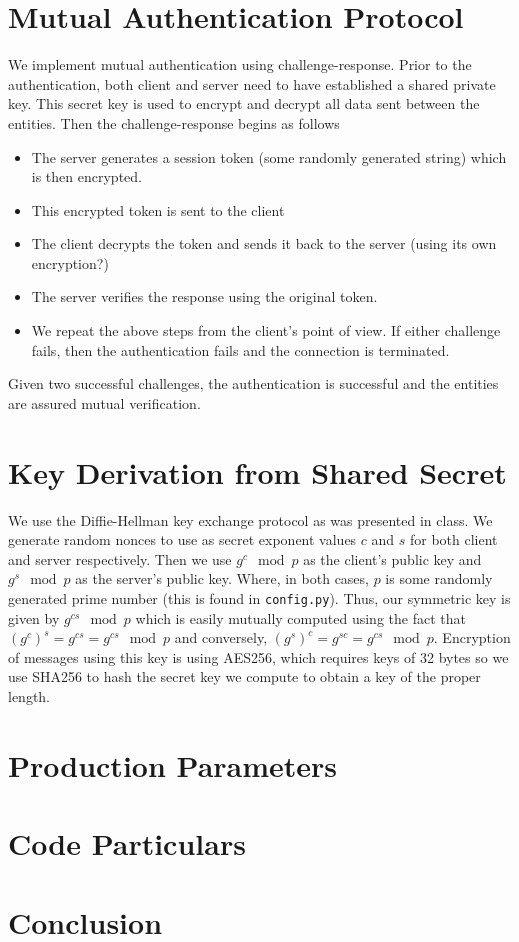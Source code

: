\documentclass[conference]{IEEEtran}
\begin{document}
\section{Mutual Authentication Protocol}
We implement mutual authentication using challenge-response. Prior to the authentication, both client and server need to have established a shared private key. This secret key is used to encrypt and decrypt all data sent between the entities. Then the challenge-response begins as follows
\begin{itemize}
	\item The server generates a session token (some randomly generated string) which is then encrypted. 
	\item This encrypted token is sent to the client
	\item The client decrypts the token and sends it back to the server (using its own encryption?)
	\item The server verifies the response using the original token.
	\item We repeat the above steps from the client's point of view. If either challenge fails, then the authentication fails and the connection is terminated. 
\end{itemize}
Given two successful challenges, the authentication is successful and the entities are assured mutual verification. 
\section{Key Derivation from Shared Secret}
We use the Diffie-Hellman key exchange protocol as was presented in class. We generate random nonces to use as secret exponent values $c$ and $s$ for both client and server respectively. Then we use $g^c\mod p$ as the client's public key and $g^s\mod p$ as the server's public key. Where, in both cases, $p$ is some randomly generated prime number (this is found in {\tt config.py}). 
Thus, our symmetric key is given by $g^{cs}\mod p$ which is easily mutually computed using the fact that $(g^c)^s = g^{cs} = g^{cs}\mod p$ and conversely, $(g^s)^c = g^{sc} = g^{cs}\mod p$. Encryption of messages using this key is using AES256, which requires keys of 32 bytes so we use SHA256 to hash the secret key we compute to obtain a key of the proper length.
\section{Production Parameters}

\section{Code Particulars}




\section{Conclusion}



\end{document}
